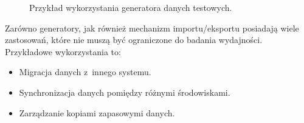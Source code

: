 \begin{figure}[ht!]
	\centering
	\theverbbox
	\caption{Przykład wykorzystania generatora danych testowych.}
	\label{vrb:test_data_generator}
\end{figure}

Zarówno generatory, jak również mechanizm importu/eksportu posiadają wiele zastosowań, które nie muszą być ograniczone do badania wydajności. Przykładowe wykorzystania to:

\begin{itemize}
	\item Migracja danych z~innego systemu.
	\item Synchronizacja danych pomiędzy różnymi środowiskami.
	\item Zarządzanie kopiami zapasowymi danych.
\end{itemize}
